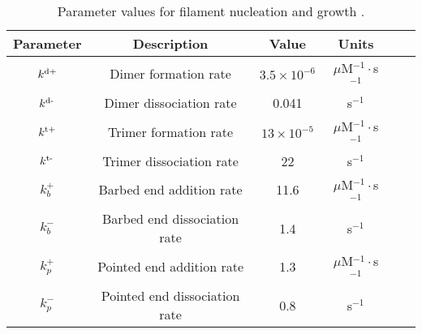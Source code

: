 \documentclass[11pt]{article}
\begin{document}
\begin{table}
\begin{center}
\begin{tabular}{|c|c|c|c|c|c|}\hline
Parameter & Description & Value & Units \\ \hline
$k^\text{d+}$ & Dimer formation rate& $3.5 \times 10^{-6}$ & $\mu$M$^{-1}\cdot$s$^{-1}$  \\ 
$k^\text{d-}$ & Dimer dissociation rate & 0.041 & s$^{-1}$\\ \hline
$k^\text{t+}$ & Trimer formation rate& $13 \times 10^{-5}$ & $\mu$M$^{-1}\cdot$s$^{-1}$  \\ 
$k^\text{t-}$ & Trimer dissociation rate & 22 & s$^{-1}$ \\ \hline
$k_b^+$ & Barbed end addition rate& 11.6 & $\mu$M$^{-1}\cdot$s$^{-1}$ \\ 
$k_b^-$ & Barbed end dissociation rate & 1.4 & s$^{-1}$\\ \hline
$k_p^+$ & Pointed end addition rate& 1.3& $\mu$M$^{-1}\cdot$s$^{-1}$  \\ 
$k_p^-$ & Pointed end dissociation rate & 0.8 & s$^{-1}$ \\ \hline
\end{tabular}
\caption{\label{tab:params} Parameter values for filament nucleation and growth \cite{rosenbloom2021mechanism}. }
\end{center}
\end{table}
\end{document}
